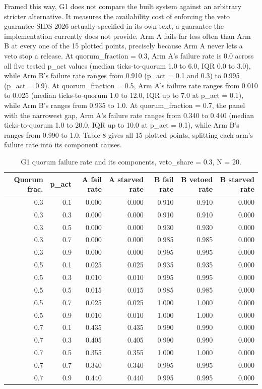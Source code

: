 Framed this way, G1 does not compare the built system against an arbitrary stricter alternative. It measures the availability cost of enforcing the veto guarantee SIDS 2026 actually specified in its own text, a guarantee the implementation currently does not provide. Arm A fails far less often than Arm B at every one of the 15 plotted points, precisely because Arm A never lets a veto stop a release. At quorum\_fraction = 0.3, Arm A's failure rate is 0.0 across all five tested p\_act values (median ticks-to-quorum 1.0 to 6.0, IQR 0.0 to 3.0), while Arm B's failure rate ranges from 0.910 (p\_act = 0.1 and 0.3) to 0.995 (p\_act = 0.9). At quorum\_fraction = 0.5, Arm A's failure rate ranges from 0.010 to 0.025 (median ticks-to-quorum 1.0 to 12.0, IQR up to 7.0 at p\_act = 0.1), while Arm B's ranges from 0.935 to 1.0. At quorum\_fraction = 0.7, the panel with the narrowest gap, Arm A's failure rate ranges from 0.340 to 0.440 (median ticks-to-quorum 1.0 to 20.0, IQR up to 10.0 at p\_act = 0.1), while Arm B's ranges from 0.990 to 1.0. Table 8 gives all 15 plotted points, splitting each arm's failure rate into its component causes.

\begin{table}[H]
\caption{G1 quorum failure rate and its components, veto\_share = 0.3, N = 20.\label{tab:t8}}
\small
\begin{tabular}{rrrrrrr}
\toprule
Quorum frac. & p\_act & A fail rate & A starved rate & B fail rate & B vetoed rate & B starved rate \\
\midrule
0.3 & 0.1 & 0.000 & 0.000 & 0.910 & 0.910 & 0.000 \\
0.3 & 0.3 & 0.000 & 0.000 & 0.910 & 0.910 & 0.000 \\
0.3 & 0.5 & 0.000 & 0.000 & 0.930 & 0.930 & 0.000 \\
0.3 & 0.7 & 0.000 & 0.000 & 0.985 & 0.985 & 0.000 \\
0.3 & 0.9 & 0.000 & 0.000 & 0.995 & 0.995 & 0.000 \\
0.5 & 0.1 & 0.025 & 0.025 & 0.935 & 0.935 & 0.000 \\
0.5 & 0.3 & 0.010 & 0.010 & 0.995 & 0.995 & 0.000 \\
0.5 & 0.5 & 0.015 & 0.015 & 0.985 & 0.985 & 0.000 \\
0.5 & 0.7 & 0.025 & 0.025 & 1.000 & 1.000 & 0.000 \\
0.5 & 0.9 & 0.010 & 0.010 & 1.000 & 1.000 & 0.000 \\
0.7 & 0.1 & 0.435 & 0.435 & 0.990 & 0.990 & 0.000 \\
0.7 & 0.3 & 0.405 & 0.405 & 0.990 & 0.990 & 0.000 \\
0.7 & 0.5 & 0.355 & 0.355 & 1.000 & 1.000 & 0.000 \\
0.7 & 0.7 & 0.340 & 0.340 & 0.995 & 0.995 & 0.000 \\
0.7 & 0.9 & 0.440 & 0.440 & 0.995 & 0.995 & 0.000 \\
\bottomrule
\end{tabular}
\end{table}

